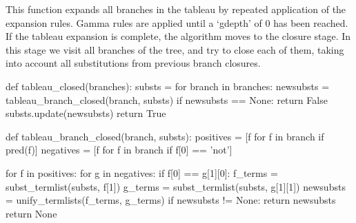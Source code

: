 \documentclass[a4paper,notitlepage]{scrartcl}
\begin{document}
This function expands all branches in the tableau by repeated application of
the expansion rules. Gamma rules are applied until a `gdepth' of 0 has been
reached. If the tableau expansion is complete, the algorithm moves to the
closure stage. In this stage we visit all branches of the tree, and try to
close each of them, taking into account all substitutions from previous branch
closures.

\begin{code}
def tableau_closed(branches):
    substs = {}
    for branch in branches:
        newsubsts = tableau_branch_closed(branch, substs)
        if newsubsts == None:
            return False
        substs.update(newsubsts)
    return True

def tableau_branch_closed(branch, substs):
    positives = [f for f in branch if pred(f)]
    negatives = [f for f in branch if f[0] == 'not']

    for f in positives:
        for g in negatives:
            if f[0] == g[1][0]:
                f_terms = subst_termlist(substs, f[1])
                g_terms = subst_termlist(substs, g[1][1])
                newsubsts = unify_termlists(f_terms, g_terms)
                if newsubsts != None:
                    return newsubsts
    return None
\end{code}
\end{document}
